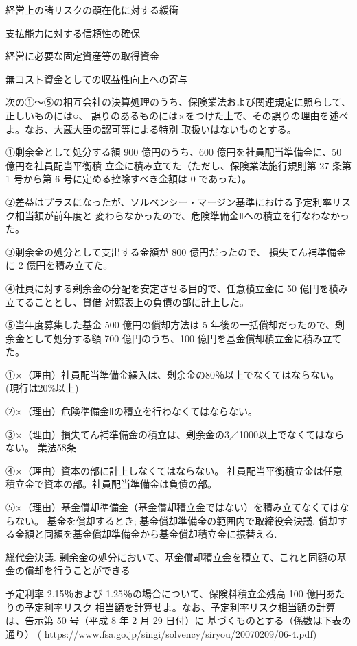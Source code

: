 \documentclass[report,gutter=10mm,fore-edge=10mm,uplatex,dvipdfmx]{jlreq}
\begin{document}
\answer{}
経営上の諸リスクの顕在化に対する緩衝

支払能力に対する信頼性の確保

経営に必要な固定資産等の取得資金

無コスト資金としての収益性向上への寄与

次の①～⑤の相互会社の決算処理のうち、保険業法および関連規定に照らして、正しいものには○、
誤りのあるものには×をつけた上で、その誤りの理由を述べよ。なお、大蔵大臣の認可等による特別
取扱いはないものとする。

①剰余金として処分する額 900 億円のうち、600 億円を社員配当準備金に、50 億円を社員配当平衡積
立金に積み立てた（ただし、保険業法施行規則第 27 条第 1 号から第 6 号に定める控除すべき金額は
0 であった）。

②差益はプラスになったが、ソルベンシー・マージン基準における予定利率リスク相当額が前年度と
変わらなかったので、危険準備金Ⅱへの積立を行なわなかった。

③剰余金の処分として支出する金額が 800 億円だったので、
損失てん補準備金に 2 億円を積み立てた。

④社員に対する剰余金の分配を安定させる目的で、任意積立金に 50 億円を積み立てることとし、貸借
対照表上の負債の部に計上した。

⑤当年度募集した基金 500 億円の償却方法は 5 年後の一括償却だったので、剰余金として処分する額
700 億円のうち、100 億円を基金償却積立金に積み立てた。

\answer{}

①×（理由）社員配当準備金繰入は、剰余金の80％以上でなくてはならない。
(現行は20\%以上)

②×（理由）危険準備金Ⅱの積立を行わなくてはならない。

③×（理由）損失てん補準備金の積立は、剰余金の3／1000以上でなくてはならない。
業法58条

④×（理由）資本の部に計上しなくてはならない。
社員配当平衡積立金は任意積立金で資本の部。社員配当準備金は負債の部。

⑤×（理由）基金償却準備金（基金償却積立金ではない）を積み立てなくてはならない。
基金を償却するとき;   
  基金償却準備金の範囲内で取締役会決議.   
  償却する金額と同額を基金償却準備金から基金償却積立金に振替える.

  総代会決議. 剰余金の処分において、基金償却積立金を積立て、これと同額の基金の償却を行うことができる

予定利率 2.15％および 1.25％の場合について、保険料積立金残高 100 億円あたりの予定利率リスク
相当額を計算せよ。なお、予定利率リスク相当額の計算は、告示第 50 号（平成 8 年 2 月 29 日付）に
基づくものとする（係数は下表の通り）
( https://www.fsa.go.jp/singi/solvency/siryou/20070209/06-4.pdf)
\end{document}

